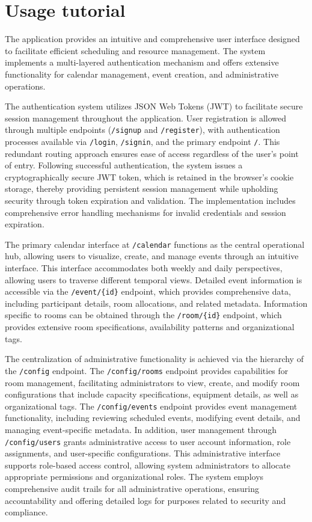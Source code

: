 \newpage
\section{Usage tutorial}\label{sec:usageTutorial}
The application provides an intuitive and comprehensive user interface designed to facilitate efficient scheduling and resource management.
The system implements a multi-layered authentication mechanism and offers extensive functionality for calendar management, event creation, and administrative operations.

The authentication system utilizes JSON Web Tokens (JWT) to facilitate secure session management throughout the application.
User registration is allowed through multiple endpoints (\texttt{/signup} and \texttt{/register}), with authentication processes available via \texttt{/login}, \texttt{/signin}, and the primary endpoint \texttt{/}.
This redundant routing approach ensures ease of access regardless of the user's point of entry.
Following successful authentication, the system issues a cryptographically secure JWT token, which is retained in the browser's cookie storage, thereby providing persistent session management while upholding security through token expiration and validation.
The implementation includes comprehensive error handling mechanisms for invalid credentials and session expiration.

The primary calendar interface at \texttt{/calendar} functions as the central operational hub, allowing users to visualize, create, and manage events through an intuitive interface.
This interface accommodates both weekly and daily perspectives, allowing users to traverse different temporal views.
Detailed event information is accessible via the \texttt{/event/\{id\}} endpoint, which provides comprehensive data, including participant details, room allocations, and related metadata.
Information specific to rooms can be obtained through the \texttt{/room/\{id\}} endpoint, which provides extensive room specifications, availability patterns and organizational tags.

The centralization of administrative functionality is achieved via the hierarchy of the \texttt{/config} endpoint.
The \texttt{/config/rooms} endpoint provides capabilities for room management, facilitating administrators to view, create, and modify room configurations that include capacity specifications, equipment details, as well as organizational tags.
The \texttt{/config/events} endpoint provides event management functionality, including reviewing scheduled events, modifying event details, and managing event-specific metadata.
In addition, user management through \texttt{/config/users} grants administrative access to user account information, role assignments, and user-specific configurations.
This administrative interface supports role-based access control, allowing system administrators to allocate appropriate permissions and organizational roles.
The system employs comprehensive audit trails for all administrative operations, ensuring accountability and offering detailed logs for purposes related to security and compliance.

